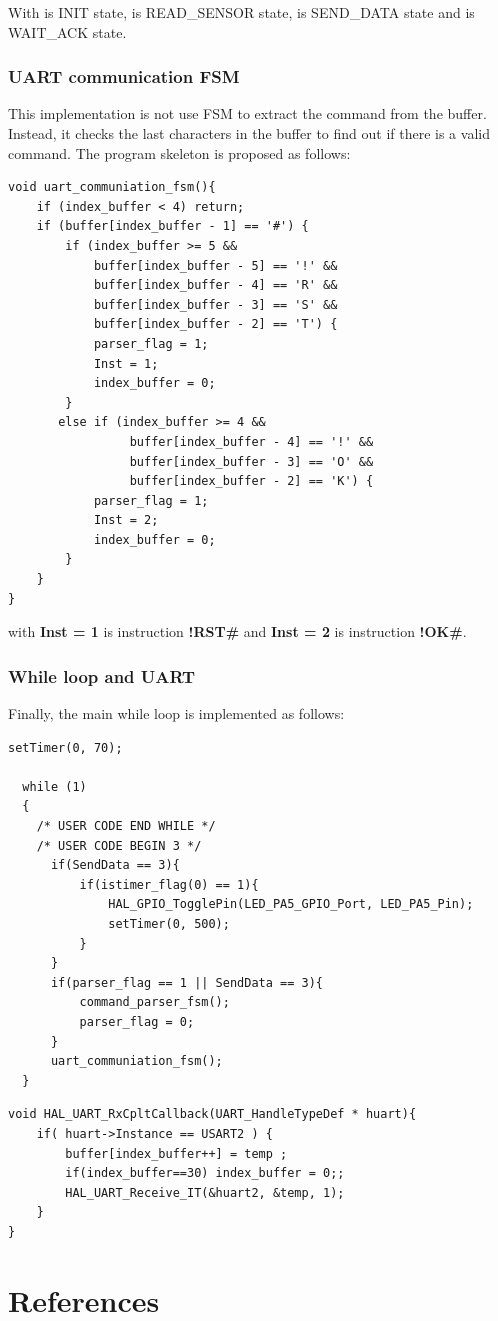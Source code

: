 \documentclass[twoside, final]{hcmut_report}
\begin{document}
With  is INIT state,  is READ\_SENSOR state,  is SEND\_DATA state and  is WAIT\_ACK state.

\subsubsection{UART communication FSM}

This implementation is not use FSM to extract the command from the buffer. Instead, it checks the last characters in the buffer to find out if there is a valid command. The program skeleton is proposed as follows:

\begin{lstlisting}[caption= Program structure for UART communication FSM]
void uart_communiation_fsm(){
	if (index_buffer < 4) return;
	if (buffer[index_buffer - 1] == '#') {
		if (index_buffer >= 5 &&
			buffer[index_buffer - 5] == '!' &&
			buffer[index_buffer - 4] == 'R' &&
			buffer[index_buffer - 3] == 'S' &&
			buffer[index_buffer - 2] == 'T') {
			parser_flag = 1;
			Inst = 1;
			index_buffer = 0;
		}
	   else if (index_buffer >= 4 &&
				 buffer[index_buffer - 4] == '!' &&
				 buffer[index_buffer - 3] == 'O' &&
				 buffer[index_buffer - 2] == 'K') {
		    parser_flag = 1;
			Inst = 2;
			index_buffer = 0;
		}
	}
}
\end{lstlisting}

with \textbf{Inst = 1} is instruction \textbf{!RST\#} and \textbf{Inst = 2} is instruction \textbf{!OK\#}.

\subsubsection{While loop and UART}
Finally, the main while loop is implemented as follows:

\begin{lstlisting}[caption= Program structure]
setTimer(0, 70);

  while (1)
  {
    /* USER CODE END WHILE */
    /* USER CODE BEGIN 3 */
	  if(SendData == 3){
		  if(istimer_flag(0) == 1){
			  HAL_GPIO_TogglePin(LED_PA5_GPIO_Port, LED_PA5_Pin);
			  setTimer(0, 500);
		  }
	  }
	  if(parser_flag == 1 || SendData == 3){
		  command_parser_fsm();
		  parser_flag = 0;
	  }
	  uart_communiation_fsm();
  }
\end{lstlisting}

\begin{lstlisting}[caption= Program for UARTRx complete callback]
void HAL_UART_RxCpltCallback(UART_HandleTypeDef * huart){
	if( huart->Instance == USART2 ) {
		buffer[index_buffer++] = temp ;
		if(index_buffer==30) index_buffer = 0;;
		HAL_UART_Receive_IT(&huart2, &temp, 1);
	}
}
\end{lstlisting}

\section*{References}
\end{document}
